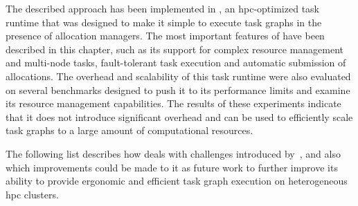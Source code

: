 The described approach has been implemented in \hyperqueue{}, an
\gls{hpc}-optimized task runtime that was designed to make it simple to execute
task graphs in the presence of allocation managers. The most important features of
\hyperqueue{} have been described in this chapter, such as its support for complex
resource management and multi-node tasks, fault-tolerant task execution and automatic submission of
allocations. The overhead and scalability of this task runtime were also evaluated on several
benchmarks designed to push it to its performance limits and examine its resource management
capabilities. The results of these experiments indicate that it does not introduce significant
overhead and can be used to efficiently scale task graphs to a large amount of computational
resources.

The following list describes how \hyperqueue{} deals with challenges introduced
by~, and also which improvements could be made to it as future work to
further improve its ability to provide ergonomic and efficient task graph execution on
heterogeneous \gls{hpc} clusters.
